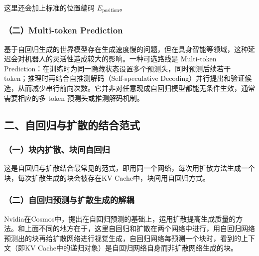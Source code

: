 这里还会加上标准的位置编码 \(E_{\mathrm{position}}\)。

\hypertarget{ux4e8cmulti-token-prediction}{%
\subsubsection{（二）Multi-token Prediction}\label{ux4e8cmulti-token-prediction}}

基于自回归生成的世界模型存在生成速度慢的问题，但在具身智能等领域，这种延迟会对机器人的灵活性造成较大的影响。一种可选路线是 Multi-token Prediction：在训练时为同一隐藏状态设置多个预测头，同时预测后续若干 token；推理时再结合自推测解码（Self-speculative Decoding）并行提出和验证候选，从而减少串行前向次数。它并非对任意现成自回归模型都能无条件生效，通常需要相应的多 token 预测头或推测解码机制。

\hypertarget{ux4e8cux81eaux56deux5f52ux4e0eux6269ux6563ux7684ux7ed3ux5408ux8303ux5f0f}{%
\subsection{二、自回归与扩散的结合范式}\label{ux4e8cux81eaux56deux5f52ux4e0eux6269ux6563ux7684ux7ed3ux5408ux8303ux5f0f}}

\hypertarget{ux4e00ux5757ux5185ux6269ux6563ux5757ux95f4ux81eaux56deux5f52}{%
\subsubsection{（一）块内扩散、块间自回归}\label{ux4e00ux5757ux5185ux6269ux6563ux5757ux95f4ux81eaux56deux5f52}}

这是自回归与扩散结合最常见的范式，即用同一个网络，每次用扩散方法生成一个块，每次扩散生成的块会被存在KV Cache中，块间用自回归方式。

\hypertarget{ux4e8cux81eaux56deux5f52ux9884ux6d4bux4e0eux6269ux6563ux751fux6210ux7684ux89e3ux8026}{%
\subsubsection{（二）自回归预测与扩散生成的解耦}\label{ux4e8cux81eaux56deux5f52ux9884ux6d4bux4e0eux6269ux6563ux751fux6210ux7684ux89e3ux8026}}

Nvidia在Cosmos中，提出在自回归预测的基础上，运用扩散提高生成质量的方法。和上面不同的地方在于，这里自回归和扩散在两个网络中进行，用自回归网络预测出的块再给扩散网络进行视觉生成，自回归网络每预测一个块时，看到的上下文（即KV Cache中的递归对象）是自回归网络自身而非扩散网络生成的块。

